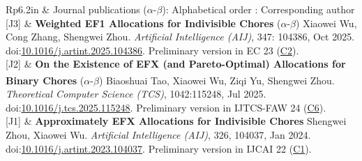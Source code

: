 \documentclass[letterpaper, 11pt]{article}
\newcommand{\headingfont}{\Large\color{OliveGreen}}
\newenvironment{SectionTable}[1]{
	\renewcommand*{\arraystretch}{1.2}
	\setlength{\tabcolsep}{8pt}
	\begin{longtable}{Rp{6.2in}} & #1 \\}
{\end{longtable}\vspace{-.7cm}}
\begin{document}
\begin{SectionTable}{\headingfont Journal publications \; \small\color{black}  ($\alpha$-$\beta$): Alphabetical order \quad \Letter: Corresponding author}

[J3] & 
\textbf{Weighted EF1 Allocations for Indivisible Chores} \newline
($\alpha$-$\beta$) Xiaowei Wu, Cong Zhang, Shengwei Zhou.  \newline
\textit{Artificial Intelligence (AIJ)}, 347: 104386, Oct 2025. doi:\href{https://doi.org/10.1016/j.artint.2025.104386}{10.1016/j.artint.2025.104386}. \newline
Preliminary version in EC 23 (\hyperlink{WEF1-EC23}{C2}).\\

[J2] & 
\textbf{On the Existence of EFX (and Pareto-Optimal) Allocations for Binary Chores} \newline
($\alpha$-$\beta$) Biaoshuai Tao, Xiaowei Wu, Ziqi Yu, Shengwei Zhou\textsuperscript{\Letter}.  \newline
\textit{Theoretical Computer Science (TCS)}, 1042:115248, Jul 2025. doi:\href{https://doi.org/10.1016/j.tcs.2025.115248}{10.1016/j.tcs.2025.115248}. \newline
Preliminary version in IJTCS-FAW 24 (\hyperlink{EFX-IJTCS24}{C6}).\\

[J1] & 
\textbf{Approximately EFX Allocations for Indivisible Chores} \newline
Shengwei Zhou, Xiaowei Wu.  \newline
\textit{Artificial Intelligence (AIJ)}, 326, 104037, Jan 2024. doi:\href{https://doi.org/10.1016/j.artint.2023.104037}{10.1016/j.artint.2023.104037}. \newline
Preliminary version in IJCAI 22 (\hyperlink{EFX-IJCAI22}{C1}).\\

\end{SectionTable}
\end{document}
